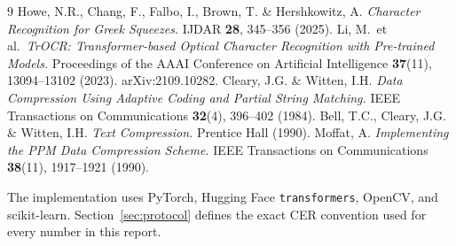 \documentclass[11pt]{article}
\newcommand{\cer}{\mbox{CER}}
\begin{document}
\begin{thebibliography}{9}\footnotesize
{} Howe, N.R., Chang, F., Falbo, I., Brown, T. \& Hershkowitz, A.
  \textit{Character Recognition for Greek Squeezes.} IJDAR \textbf{28}, 345--356 (2025).
 Li, M.\ et al.\ \textit{TrOCR: Transformer-based Optical Character Recognition
  with Pre-trained Models.} Proceedings of the AAAI Conference on Artificial Intelligence
  \textbf{37}(11), 13094--13102 (2023). arXiv:2109.10282.
 Cleary, J.G. \& Witten, I.H. \textit{Data Compression Using Adaptive Coding
  and Partial String Matching.} IEEE Transactions on Communications \textbf{32}(4), 396--402
  (1984).
 Bell, T.C., Cleary, J.G. \& Witten, I.H. \textit{Text Compression.}
  Prentice Hall (1990).
 Moffat, A. \textit{Implementing the PPM Data Compression Scheme.}
  IEEE Transactions on Communications \textbf{38}(11), 1917--1921 (1990).
\end{thebibliography}
{\footnotesize\noindent The implementation uses PyTorch, Hugging Face \texttt{transformers},
OpenCV, and scikit-learn. Section~\ref{sec:protocol} defines the exact \cer{} convention used for
every number in this report.}
\end{document}
